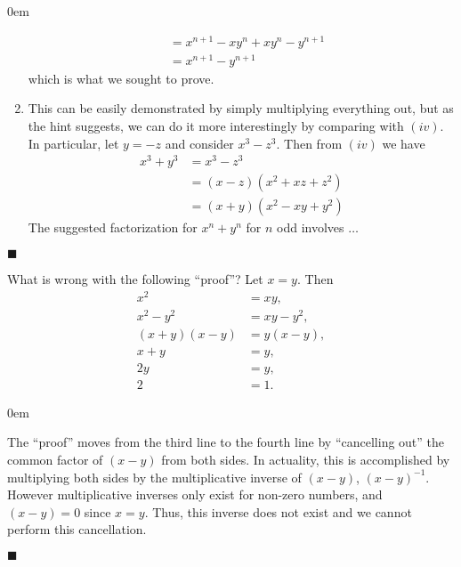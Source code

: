 \documentclass[12pt]{article}
\renewcommand{\qed}{\hfill$\blacksquare$}
\renewenvironment{proof}{\begin{addmargin}[1em]{0em}\begin{newproof}}{\end{newproof}\end{addmargin}\qed}
\newenvironment{problem}[2][Problem]{\begin{trivlist}
\item[\hskip \labelsep {\bfseries #1}\hskip \labelsep {\bfseries #2.}]}{\end{trivlist}}
\begin{document}
\begin{proof}
\begin{enumerate}[label=(\roman*)]
\begin{equation*}
\begin{split}
		& = x^{n+1} - xy^n + xy^n - y^{n+1} \\ 
		& = x^{n+1} - y^{n+1}
	\end{split}\end{equation*} which is what we sought to prove.
	\item This can be easily demonstrated by simply multiplying everything out, but as the hint suggests, we can do it more interestingly by comparing with $\left(iv\right)$. In particular, let $y=-z$ and consider $x^3 - z^3$. Then from $\left(iv\right)$ we have
	\begin{equation*}\begin{split}
		x^3 + y^3 & = x^3 - z^3 \\
		& = \left(x-z\right) \left(x^2 + xz + z^2\right) \\
		& = \left(x+y\right) \left(x^2 - xy + y^2 \right)
	\end{split} \end{equation*} The suggested factorization for $x^n + y^n$ for $n$ odd involves $\ldots$
\end{enumerate}


\end{proof}



\begin{problem}{1.2}
What is wrong with the following ``proof''? Let $x=y$. Then
\begin{equation*}\begin{split}
x^2 & = xy, \\
x^2 - y^2 & =xy-y^2, \\
\left(x+y\right)\left(x-y\right) & =y\left(x-y\right),\\
x+y & = y, \\
2y & =y, \\
2 &= 1.
\end{split}\end{equation*}
\end{problem}
\begin{proof}
The ``proof'' moves from the third line to the fourth line by ``cancelling out'' the common factor of $\left(x-y\right)$ from both sides. In actuality, this is accomplished by multiplying both sides by the multiplicative inverse of $\left(x-y\right)$, $\left(x-y\right)^{-1}$. However multiplicative inverses only exist for non-zero numbers, and $\left(x-y\right)=0$ since $x=y$. Thus, this inverse does not exist and we cannot perform this cancellation.
\end{proof}
\end{document}
